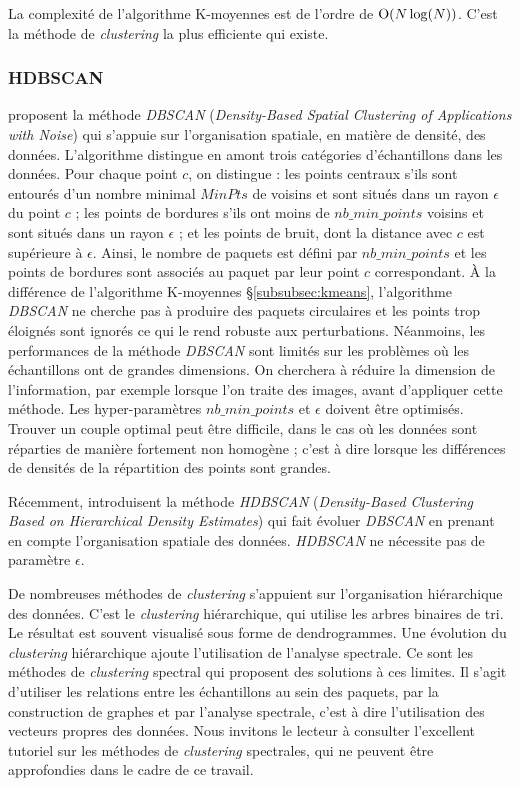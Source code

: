 La complexité de l'algorithme K-moyennes est de l'ordre de  $\operatorname{O}(N \log(N))$.
C'est la méthode de \textit{clustering} la plus efficiente qui existe.

\subsubsection{HDBSCAN} \label{subsubsec:hdbscan}
\citeauthor{ester_densitybased_1996} \cite{ester_densitybased_1996} proposent la méthode \textit{DBSCAN} (\textit{Density-Based Spatial Clustering of Applications with Noise}) qui s'appuie sur l'organisation spatiale, en matière de densité, des données.
L'algorithme distingue en amont trois catégories d'échantillons dans les données.
Pour chaque point $c$, on distingue : les points centraux s'ils sont entourés d'un nombre minimal $MinPts$ de voisins et sont situés dans un rayon $\epsilon$ du point $c$ ; les points de bordures s'ils ont moins de $nb\_min\_points$ voisins et sont situés dans un rayon $\epsilon$ ; et les points de bruit, dont la distance avec $c$ est supérieure à $\epsilon$.
Ainsi, le nombre de paquets est défini par $nb\_min\_points$ et les points de bordures sont associés au paquet par leur point $c$ correspondant.
À la différence de l'algorithme K-moyennes §\ref{subsubsec:kmeans}, l'algorithme \textit{DBSCAN} ne cherche pas à produire des paquets circulaires et les points trop éloignés sont ignorés ce qui le rend robuste aux perturbations.
Néanmoins, les performances de la méthode \textit{DBSCAN} sont limités sur les problèmes où les échantillons ont de grandes dimensions. On cherchera à réduire la dimension de l'information, par exemple lorsque l'on traite des images, avant d'appliquer cette méthode.
Les hyper-paramètres $nb\_min\_points$ et $\epsilon$ doivent être optimisés. Trouver un couple optimal peut être difficile, dans le cas où les données sont réparties de manière fortement non homogène ; c'est à dire lorsque les différences de densités de la répartition des points sont grandes.

Récemment, \citeauthor{campello_densitybased_2013} \cite{campello_densitybased_2013} introduisent la méthode \textit{HDBSCAN} (\textit{Density-Based Clustering Based on Hierarchical Density Estimates}) qui fait évoluer \textit{DBSCAN} en prenant en compte l'organisation spatiale des données.
\textit{HDBSCAN} ne nécessite pas de paramètre $\epsilon$.

De nombreuses méthodes de \textit{clustering} s'appuient sur l'organisation hiérarchique des données.
C'est le \textit{clustering} hiérarchique, qui utilise les arbres binaires de tri.
Le résultat est souvent visualisé sous forme de dendrogrammes.
Une évolution du \textit{clustering} hiérarchique ajoute l'utilisation de l'analyse spectrale.
Ce sont les méthodes de \textit{clustering} spectral qui proposent des solutions à ces limites.
Il s'agit d'utiliser les relations entre les échantillons au sein des paquets, par la construction de graphes et par l'analyse spectrale, c'est à dire l'utilisation des vecteurs propres des données.
Nous invitons le lecteur à consulter l'excellent tutoriel  \cite{vonluxburg_tutorial_2007} sur les méthodes de \textit{clustering} spectrales, qui ne peuvent être approfondies dans le cadre de ce travail.

